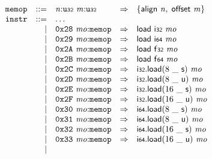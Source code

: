 $$
\begin{array}{@{}l@{}rrlll@{}l@{}}
& {\mathtt{memop}} &::=& {\mathit{n}}{:}{\mathtt{u{\scriptstyle32}}}~{\mathit{m}}{:}{\mathtt{u{\scriptstyle32}}} &\Rightarrow& \{ \begin{array}[t]{@{}l@{}}
\mathsf{align}~{\mathit{n}},\; \mathsf{offset}~{\mathit{m}} \}\end{array} \\
& {\mathtt{instr}} &::=& \dots \\ &&|&
\mathtt{0x28}~{\mathit{mo}}{:}{\mathtt{memop}} &\Rightarrow& \mathsf{load}~\mathsf{i{\scriptstyle32}}~{\mathit{mo}} \\ &&|&
\mathtt{0x29}~{\mathit{mo}}{:}{\mathtt{memop}} &\Rightarrow& \mathsf{load}~\mathsf{i{\scriptstyle64}}~{\mathit{mo}} \\ &&|&
\mathtt{0x2A}~{\mathit{mo}}{:}{\mathtt{memop}} &\Rightarrow& \mathsf{load}~\mathsf{f{\scriptstyle32}}~{\mathit{mo}} \\ &&|&
\mathtt{0x2B}~{\mathit{mo}}{:}{\mathtt{memop}} &\Rightarrow& \mathsf{load}~\mathsf{f{\scriptstyle64}}~{\mathit{mo}} \\ &&|&
\mathtt{0x2C}~{\mathit{mo}}{:}{\mathtt{memop}} &\Rightarrow& {\mathsf{i{\scriptstyle32}}.\mathsf{load}}{(8~\mathsf{\_}~\mathsf{s})}~{\mathit{mo}} \\ &&|&
\mathtt{0x2D}~{\mathit{mo}}{:}{\mathtt{memop}} &\Rightarrow& {\mathsf{i{\scriptstyle32}}.\mathsf{load}}{(8~\mathsf{\_}~\mathsf{u})}~{\mathit{mo}} \\ &&|&
\mathtt{0x2E}~{\mathit{mo}}{:}{\mathtt{memop}} &\Rightarrow& {\mathsf{i{\scriptstyle32}}.\mathsf{load}}{(16~\mathsf{\_}~\mathsf{s})}~{\mathit{mo}} \\ &&|&
\mathtt{0x2F}~{\mathit{mo}}{:}{\mathtt{memop}} &\Rightarrow& {\mathsf{i{\scriptstyle32}}.\mathsf{load}}{(16~\mathsf{\_}~\mathsf{u})}~{\mathit{mo}} \\ &&|&
\mathtt{0x30}~{\mathit{mo}}{:}{\mathtt{memop}} &\Rightarrow& {\mathsf{i{\scriptstyle64}}.\mathsf{load}}{(8~\mathsf{\_}~\mathsf{s})}~{\mathit{mo}} \\ &&|&
\mathtt{0x31}~{\mathit{mo}}{:}{\mathtt{memop}} &\Rightarrow& {\mathsf{i{\scriptstyle64}}.\mathsf{load}}{(8~\mathsf{\_}~\mathsf{u})}~{\mathit{mo}} \\ &&|&
\mathtt{0x32}~{\mathit{mo}}{:}{\mathtt{memop}} &\Rightarrow& {\mathsf{i{\scriptstyle64}}.\mathsf{load}}{(16~\mathsf{\_}~\mathsf{s})}~{\mathit{mo}} \\ &&|&
\mathtt{0x33}~{\mathit{mo}}{:}{\mathtt{memop}} &\Rightarrow& {\mathsf{i{\scriptstyle64}}.\mathsf{load}}{(16~\mathsf{\_}~\mathsf{u})}~{\mathit{mo}} \\ &&|&

\end{array}$$
